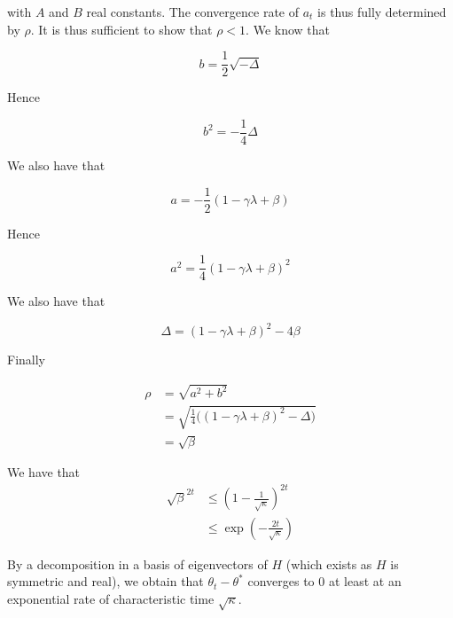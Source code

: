 \documentclass[
10pt, %
a4paper, %
oneside, %
headinclude,footinclude, %
BCOR5mm, %
]{scrartcl}
\begin{document}
with $A$ and $B$ real constants. The convergence rate of $a_t$ is thus fully determined by $\rho$. It is thus sufficient to show that $\rho<1$. We know that

\begin{equation}
b= \frac{1}{2} \sqrt{- \Delta}
\end{equation}

Hence

\begin{equation}
    b^2 = -\frac{1}{4} \Delta
\end{equation}

We also have that

\begin{equation}
    a= -\frac{1}{2} (1- \gamma\lambda + \beta)
\end{equation}

Hence

\begin{equation}
    a^2 = \frac{1}{4} (1- \gamma\lambda + \beta)^2
\end{equation}

We also have that

\begin{equation}
    \Delta = (1- \gamma\lambda + \beta)^2-4\beta
\end{equation}

Finally

\begin{equation}
    \begin{aligned}
        \label{eq:}
	\rho &=  \sqrt{a^2+b^2}\\
	&= \sqrt{\frac{1}{4} \Big( (1- \gamma\lambda +\beta)^2-\Delta \Big)}\\
	&=  \sqrt{\beta}
    \end{aligned}
\end{equation}

\exercice{}

We have that 
\begin{equation}
	\begin{aligned}
		\label{eq:}
		\sqrt{\beta}^{2t} &\leq (1- \frac{1}{\sqrt{\kappa}})^{2t}\\
		&\leq \exp(- \frac{2t}{\sqrt{\kappa}})
	\end{aligned}
\end{equation}

By a decomposition in a basis of eigenvectors of $H$ (which exists as $H$ is symmetric and real), we obtain that $\theta_t-\theta^*$ converges to $0$ at least at an exponential rate of characteristic time $\sqrt{\kappa}$.
\end{document}
